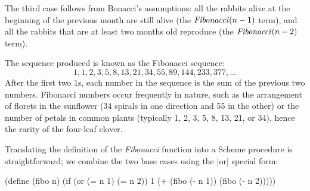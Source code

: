\begin{schemeregion}
{The third case follows from Bonacci's assumptions: all the rabbits alive at the beginning of the previous month are still alive (the $\textrm{\emph{Fibonacci}}(n-1)$ term), and all the rabbits that are at least two months old reproduce (the $\textrm{\emph{Fibonacci}}(n-2)$ term).

The sequence produced is known as the Fibonacci sequence:
\begin{displaymath}
1, 1, 2, 3, 5, 8, 13, 21, 34, 55, 89, 144, 233, 377, \ldots
\end{displaymath}
After the first two 1s, each number in the sequence is the sum of the previous two numbers.  Fibonacci numbers occur frequently in nature, such as the arrangement of florets in the sunflower (34 spirals in one direction and 55 in the other) or the number of petals in common plants (typically 1, 2, 3, 5, 8, 13, 21, or 34), hence the rarity of the four-leaf clover.%


Translating the definition of the \emph{Fibonacci} function into a Scheme procedure is straightforward; we combine the two base cases using the \scheme|or| special form:
\begin{schemedisplay}
(define (fibo n)
  (if (or (= n 1) (= n 2)) 1
      (+ (fibo (- n 1)) (fibo (- n 2)))))
\end{schemedisplay}


}
\end{schemeregion}
